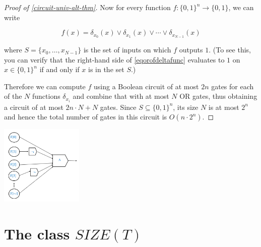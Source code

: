 \begin{proof}[Proof of \cref{circuit-univ-alt-thm}]
Now for every function \(f:\{0,1\}^n \rightarrow \{0,1\}\), we can write

\[
f(x) = \delta_{x_0}(x) \vee \delta_{x_1}(x) \vee \cdots \vee \delta_{x_{N-1}}(x) \label{eqorofdeltafunc}
\]

where \(S=\{ x_0 ,\ldots, x_{N-1}\}\) is the set of inputs on which
\(f\) outputs \(1\). (To see this, you can verify that the right-hand
side of \eqref{eqorofdeltafunc} evaluates to \(1\) on \(x\in \{0,1\}^n\)
if and only if \(x\) is in the set \(S\).)

Therefore we can compute \(f\) using a Boolean circuit of at most \(2n\)
gates for each of the \(N\) functions \(\delta_{x_i}\) and combine that
with at most \(N\) OR gates, thus obtaining a circuit of at most
\(2n\cdot N + N\) gates. Since \(S \subseteq \{0,1\}^n\), its size \(N\)
is at most \(2^n\) and hence the total number of gates in this circuit
is \(O(n\cdot 2^n)\).

\end{proof}


\begin{marginfigure}
\centering
\includegraphics[width=\linewidth, height=1.5in, keepaspectratio]{../figure/deltafunc.png}
\caption{For every string \(\alpha\in \{0,1\}^n\), there is a Boolean
circuit of \(O(n)\) gates to compute the function
\(\delta_\alpha:\{0,1\}^n \rightarrow \{0,1\}\) such that
\(\delta_\alpha(x)=1\) if and only if \(x=\alpha\). The circuit is very
simple. Given input \(x_0,\ldots,x_{n-1}\) we compute the AND of
\(z_0,\ldots,z_{n-1}\) where \(z_i=x_i\) if \(\alpha_i=1\) and
\(z_i = \ensuremath{\mathit{NOT}}(x_i)\) if \(\alpha_i=0\). While
formally Boolean circuits only have a gate for computing the AND of two
inputs, we can implement an AND of \(n\) inputs by composing \(n\)
two-input ANDs.}
\label{deltafuncfig}
\end{marginfigure}

\section{The class
\(\ensuremath{\mathit{SIZE}}(T)\)}\label{secdefinesizeclasses}

